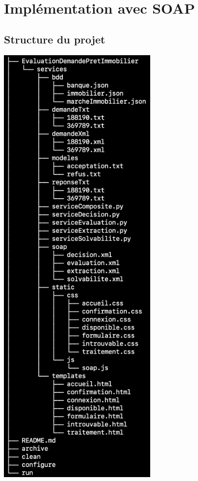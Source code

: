\documentclass{article}
\begin{document}
 \section{Implémentation avec SOAP}
	\subsection{Structure du projet}
 
    \includegraphics[width=225pt]{Images/7.1/tree.png}\\
\end{document}
